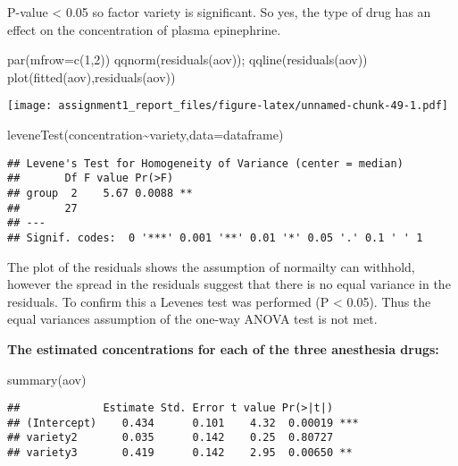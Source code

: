 \documentclass[
]{article}
\newenvironment{Shaded}{\begin{snugshade}}{\end{snugshade}}
\newcommand{\AttributeTok}[1]{\textcolor[rgb]{0.77,0.63,0.00}{#1}}
\newcommand{\DecValTok}[1]{\textcolor[rgb]{0.00,0.00,0.81}{#1}}
\newcommand{\FunctionTok}[1]{\textcolor[rgb]{0.00,0.00,0.00}{#1}}
\newcommand{\NormalTok}[1]{#1}
\newcommand{\SpecialCharTok}[1]{\textcolor[rgb]{0.00,0.00,0.00}{#1}}
\begin{document}
P-value \textless{} 0.05 so factor variety is significant. So yes, the
type of drug has an effect on the concentration of plasma epinephrine.

\begin{Shaded}
\begin{Highlighting}[]
\FunctionTok{par}\NormalTok{(}\AttributeTok{mfrow=}\FunctionTok{c}\NormalTok{(}\DecValTok{1}\NormalTok{,}\DecValTok{2}\NormalTok{))}
\FunctionTok{qqnorm}\NormalTok{(}\FunctionTok{residuals}\NormalTok{(aov)); }\FunctionTok{qqline}\NormalTok{(}\FunctionTok{residuals}\NormalTok{(aov))}
\FunctionTok{plot}\NormalTok{(}\FunctionTok{fitted}\NormalTok{(aov),}\FunctionTok{residuals}\NormalTok{(aov))}
\end{Highlighting}
\end{Shaded}

\texttt{[image: assignment1\_report\_files/figure-latex/unnamed-chunk-49-1.pdf]}

\begin{Shaded}
\begin{Highlighting}[]
\FunctionTok{leveneTest}\NormalTok{(concentration}\SpecialCharTok{\textasciitilde{}}\NormalTok{variety,}\AttributeTok{data=}\NormalTok{dataframe)}
\end{Highlighting}
\end{Shaded}

\begin{verbatim}
## Levene's Test for Homogeneity of Variance (center = median)
##       Df F value Pr(>F)   
## group  2    5.67 0.0088 **
##       27                  
## ---
## Signif. codes:  0 '***' 0.001 '**' 0.01 '*' 0.05 '.' 0.1 ' ' 1
\end{verbatim}

The plot of the residuals shows the assumption of normailty can
withhold, however the spread in the residuals suggest that there is no
equal variance in the residuals. To confirm this a Levenes test was
performed (P \textless{} 0.05). Thus the equal variances assumption of
the one-way ANOVA test is not met.

\textbf{The estimated concentrations for each of the three anesthesia
drugs:}

\begin{Shaded}
\begin{Highlighting}[]
\FunctionTok{summary}\NormalTok{(aov)}
\end{Highlighting}
\end{Shaded}

\begin{verbatim}
##             Estimate Std. Error t value Pr(>|t|)    
## (Intercept)    0.434      0.101    4.32  0.00019 ***
## variety2       0.035      0.142    0.25  0.80727    
## variety3       0.419      0.142    2.95  0.00650 ** 
\end{verbatim}
\end{document}
